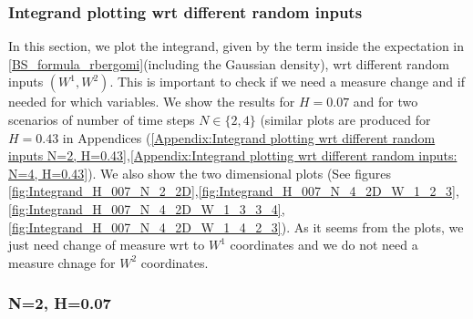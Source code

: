 \documentclass[11pt]{article}
\begin{document}
 \subsubsection{Integrand plotting wrt different random inputs } \label{sec:Integrand plotting wrt different random inputs}
 In this section, we plot the integrand, given by the term inside the expectation in \eqref{BS_formula_rbergomi}(including the Gaussian density), wrt different random inputs $(W^1,W^2)$. This is important to check if we need a measure change and if needed for which variables. We show the results for  $H=0.07$ and for two scenarios of number of time steps $N \in \{2,4\}$ (similar plots are produced for $H=0.43$ in Appendices (\ref{Appendix:Integrand plotting wrt different random inputs N=2, H=0.43},\ref{Appendix:Integrand plotting wrt different random inputs: N=4, H=0.43}). We also show the two dimensional plots (See figures \ref{fig:Integrand_H_007_N_2_2D},\ref{fig:Integrand_H_007_N_4_2D_W_1_2_3},\ref{fig:Integrand_H_007_N_4_2D_W_1_3_3_4},\ref{fig:Integrand_H_007_N_4_2D_W_1_4_2_3}). As it seems from the plots, we  just need change of measure wrt to $W^1$ coordinates and we do not need a measure chnage for $W^2$ coordinates. 
 
 
 
 \subsubsection*{N=2, H=0.07}
 
\end{document}
